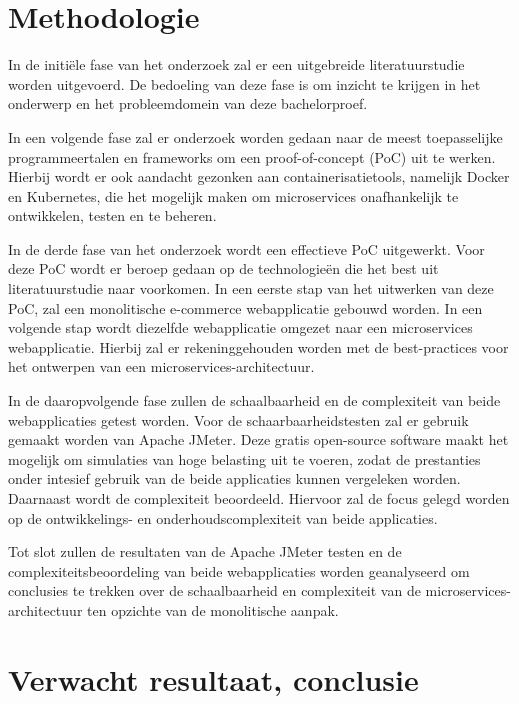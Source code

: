 
\section{Methodologie}%
\label{sec:methodologie}

In de initiële fase van het onderzoek zal er een uitgebreide literatuurstudie worden uitgevoerd. De bedoeling van deze fase is om inzicht te krijgen in het onderwerp en het probleemdomein van deze bachelorproef.

In een volgende fase zal er onderzoek worden gedaan naar de meest toepasselijke programmeertalen en frameworks om een proof-of-concept (PoC) uit te werken. Hierbij wordt er ook aandacht gezonken aan containerisatietools, namelijk Docker en Kubernetes, die het mogelijk maken om microservices onafhankelijk te ontwikkelen, testen en te beheren.

In de derde fase van het onderzoek wordt een effectieve PoC uitgewerkt. Voor deze PoC wordt er beroep gedaan op de technologieën die het best uit literatuurstudie naar voorkomen. In een eerste stap van het uitwerken van deze PoC, zal een monolitische e-commerce webapplicatie gebouwd worden. In een volgende stap wordt diezelfde webapplicatie omgezet naar een microservices webapplicatie. Hierbij zal er rekeninggehouden worden met de best-practices voor het ontwerpen van een microservices-architectuur.

In de daaropvolgende fase zullen de schaalbaarheid en de complexiteit van beide webapplicaties getest worden. Voor de schaarbaarheidstesten zal er gebruik gemaakt worden van Apache JMeter. Deze gratis open-source software maakt het mogelijk om simulaties van hoge belasting uit te voeren, zodat de prestanties onder intesief gebruik van de beide applicaties kunnen vergeleken worden. Daarnaast wordt de complexiteit beoordeeld. Hiervoor zal de focus gelegd worden op de ontwikkelings- en onderhoudscomplexiteit van beide applicaties.

Tot slot zullen de resultaten van de Apache JMeter testen en de complexiteitsbeoordeling van beide webapplicaties worden geanalyseerd om conclusies te trekken over de schaalbaarheid en complexiteit van de microservices-architectuur ten opzichte van de monolitische aanpak.

\section{Verwacht resultaat, conclusie}%
\label{sec:verwachte_resultaten}

